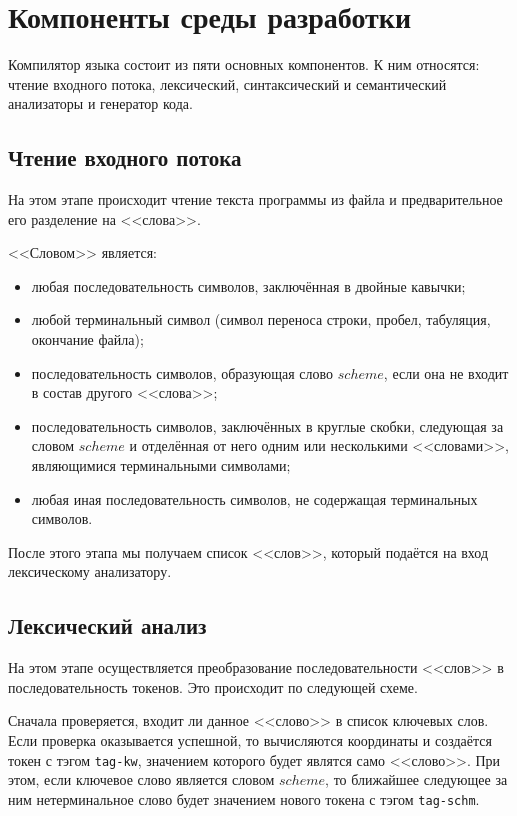 \section{Компоненты среды разработки}
    Компилятор языка состоит из пяти основных компонентов.
    К ним относятся: чтение входного потока, лексический, синтаксический и семантический анализаторы и генератор кода.
    \subsection{Чтение входного потока}
    На этом этапе происходит чтение текста программы из файла и предварительное его разделение на <<слова>>.

    <<Словом>> является:
    \begin{itemize}
        \item любая последовательность символов, заключённая в двойные кавычки;
        \item любой терминальный символ (символ переноса строки, пробел, табуляция, окончание файла);
        \item последовательность символов, образующая слово $scheme$, если она не входит в состав другого <<слова>>;
        \item последовательность символов, заключённых в круглые скобки, следующая за словом $scheme$ и отделённая от него одним или несколькими <<словами>>, являющимися терминальными символами;
        \item любая иная последовательность символов, не содержащая терминальных символов.
    \end{itemize}

    После этого этапа мы получаем список <<слов>>, который подаётся на вход лексическому анализатору.
    
    \subsection{Лексический анализ}
    На этом этапе осуществляется преобразование последовательности <<слов>> в последовательность токенов.
    Это происходит по следующей схеме.

    Сначала проверяется, входит ли данное <<слово>> в список ключевых слов.
    Если проверка оказывается успешной, то вычисляются координаты и создаётся токен с тэгом \verb$tag-kw$, значением которого будет являтся само <<слово>>.
    При этом, если ключевое слово является словом $scheme$, то ближайшее следующее за ним нетерминальное слово будет значением нового токена с тэгом \verb$tag-schm$.

